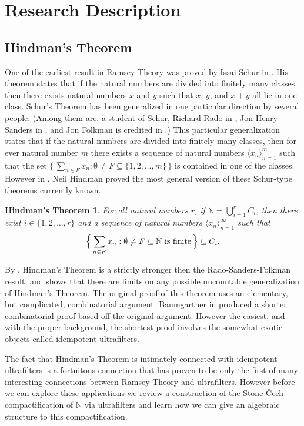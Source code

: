 \documentclass[12pt]{article}
\theoremstyle{plain}
\newtheorem{fst}[thm]{Hindman's Theorem}
\theoremstyle{definition}
\newcommand{\bbN}{\mathbb{N}}
\newcommand{\la}{\langle}
\newcommand{\ra}{\rangle}
\begin{document}
\section{Research Description}
\subsection{Hindman's Theorem}
One of the earliest result in Ramsey Theory was proved by Issai Schur
in \cite{Schur:1916fk}.
His theorem states that if the natural numbers are divided into
finitely many classes, then there exists natural numbers $x$ and $y$
such that $x$, $y$, and $x+y$ all lie in one class.
Schur's Theorem has been generalized in one particular direction by
several people.
(Among them are, a student of Schur, Richard Rado in
\cite{Rado:1933kx}, Jon Henry Sanders in \cite{Sanders:1968uq}, and
Jon Folkman is credited in \cite{Graham:1971vn}.)
This particular generalization states that if the natural numbers are
divided into finitely many classes, then for ever natural number $m$
there exists a sequence of natural numbers $\la x_n \ra_{n=1}^m$ such
that the set $\bigl\{\, \sum_{n \in F} x_n : \emptyset \ne F \subseteq \{1,
2, \ldots, m\} \,\bigr\}$ is contained in one of the classes.
However in \cite{Hindman:1974ys}, Neil Hindman proved the most general
version of these Schur-type theorems currently known. 

  \begin{fst}
    For all natural numbers $r$, if \/ $\bbN = \bigcup_{i=1}^r C_i$, then
    there exist $i \in \{1, 2, \ldots, r\}$ and a sequence of natural
    numbers $\la x_n \ra_{n=1}^\infty$ such that
      \[
        \Bigl\{\, \sum_{n\in F} x_n : \emptyset \ne F \subseteq \bbN
        \hbox{ is finite} \,\Bigr\} \subseteq C_i.
      \]
  \end{fst}

By \cite[Theorems 16.28 and 16.29]{Hindman:1998fk}, Hindman's Theorem
is a strictly stronger then the Rado-Sanders-Folkman result, and
\cite{Milliken:1978fk} shows that there are limits on any possible
uncountable generalization of Hindman's Theorem.
The original proof of this theorem uses an elementary, but
complicated, combinatorial argument. 
Baumgartner in \cite{Baumgartner:1974uq} produced a shorter
combinatorial proof based off the original argument. 
However the easiest, and with the proper background, the shortest
proof involves the somewhat exotic objects called idempotent
ultrafilters. 

The fact that Hindman's Theorem is intimately connected with
idempotent ultrafilters is a fortuitous connection that has proven to
be only the first of many interesting connections between Ramsey
Theory and ultrafilters.
However before we can explore these applications we review a
construction of the Stone-\v{C}ech compactification of $\bbN$ via
ultrafilters and learn how we can give an algebraic structure to this
compactification.
\end{document}
